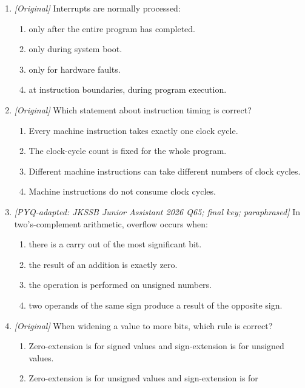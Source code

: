 \begin{enumerate}[label=\textbf{Q\arabic*.}, leftmargin=*]
\begin{enumerate}[label=\Alph*.]
    \item the value of the operand.
    \item the width of the data bus.
  \end{enumerate}
\item \textit{[Original]} Interrupts are normally processed:
  \begin{enumerate}[label=\Alph*.]
    \item only after the entire program has completed.
    \item only during system boot.
    \item only for hardware faults.
    \item at instruction boundaries, during program execution.
  \end{enumerate}
\item \textit{[Original]} Which statement about instruction timing is correct?
  \begin{enumerate}[label=\Alph*.]
    \item Every machine instruction takes exactly one clock cycle.
    \item The clock-cycle count is fixed for the whole program.
    \item Different machine instructions can take different numbers of clock
      cycles.
    \item Machine instructions do not consume clock cycles.
  \end{enumerate}
\item \textit{[PYQ-adapted: JKSSB Junior Assistant 2026 Q65; final key;
paraphrased]} In two's-complement arithmetic, overflow occurs when:
  \begin{enumerate}[label=\Alph*.]
    \item there is a carry out of the most significant bit.
    \item the result of an addition is exactly zero.
    \item the operation is performed on unsigned numbers.
    \item two operands of the same sign produce a result of the opposite
      sign.
  \end{enumerate}
\item \textit{[Original]} When widening a value to more bits, which rule is
correct?
  \begin{enumerate}[label=\Alph*.]
    \item Zero-extension is for signed values and sign-extension is for
      unsigned values.
    \item Zero-extension is for unsigned values and sign-extension is for

\end{enumerate}
\end{enumerate}

